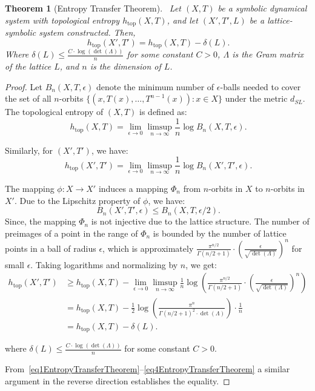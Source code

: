\documentclass[12pt,a4paper]{article}
\newtheorem{theorem}{Theorem}[section]
\begin{document}
\begin{theorem}[Entropy Transfer Theorem]~\label{EntropyTransferTheorem}
Let $(X, T)$ be a symbolic dynamical system with topological entropy $h_{\text{top}}(X, T)$, and let $(X', T', L)$ be a lattice-symbolic system constructed. Then,
\begin{equation}~\label{eq1EntropyTransferTheorem}
h_{\text{top}}(X', T') = h_{\text{top}}(X, T) - \delta(L).
\end{equation}
Where $\delta(L) \leq \frac{C \cdot \log(\det(\Lambda))}{n}$ for some constant $C > 0$, $\Lambda$ is the Gram matrix of the lattice $L$, and $n$ is the dimension of $L$.
\end{theorem}

\begin{proof}
Let $B_n(X, T, \epsilon)$ denote the minimum number of $\epsilon$-balls needed to cover the set of all $n$-orbits $\{(x, T(x), \ldots, T^{n-1}(x)) : x \in X\}$ under the metric $d_{SL}$. The topological entropy of $(X, T)$ is defined as:
\begin{equation}~\label{eq2EntropyTransferTheorem}
h_{\text{top}}(X, T) = \lim_{\epsilon \to 0} \limsup_{n \to \infty} \frac{1}{n} \log B_n(X, T, \epsilon).
\end{equation}

Similarly, for $(X', T')$, we have:
\begin{equation}~\label{eq3EntropyTransferTheorem}
h_{\text{top}}(X', T') = \lim_{\epsilon \to 0} \limsup_{n \to \infty} \frac{1}{n} \log B_n(X', T', \epsilon).
\end{equation}

The mapping $\phi: X \to X'$ induces a mapping $\Phi_n$ from $n$-orbits in $X$ to $n$-orbits in $X'$. Due to the Lipschitz property of $\phi$, we have:
\begin{equation}~\label{eq4EntropyTransferTheorem}
B_n(X', T', \epsilon) \leq B_n(X, T, \epsilon/2).
\end{equation}
\noindent
Since, the mapping $\Phi_n$ is not injective due to the lattice structure. The number of preimages of a point in the range of $\Phi_n$ is bounded by the number of lattice points in a ball of radius $\epsilon$, which is approximately $\frac{\pi^{n/2}}{\Gamma(n/2+1)} \cdot \left(\frac{\epsilon}{\sqrt{\det(\Lambda)}}\right)^n$ for small $\epsilon$. Taking logarithms and normalizing by $n$, we get:
\begin{align*}
h_{\text{top}}(X', T') &\geq h_{\text{top}}(X, T) - \lim_{\epsilon \to 0} \limsup_{n \to \infty} \frac{1}{n} \log\left(\frac{\pi^{n/2}}{\Gamma(n/2+1)} \cdot \left(\frac{\epsilon}{\sqrt{\det(\Lambda)}}\right)^n\right) \\
&= h_{\text{top}}(X, T) - \frac{1}{2} \log\left(\frac{\pi^{n}}{\Gamma(n/2+1)^2 \cdot \det(\Lambda)}\right) \cdot \frac{1}{n} \\
&= h_{\text{top}}(X, T) - \delta(L).
\end{align*}

where $\delta(L) \leq \frac{C \cdot \log(\det(\Lambda))}{n}$ for some constant $C > 0$.

From~\eqref{eq1EntropyTransferTheorem}--\eqref{eq4EntropyTransferTheorem} a similar argument in the reverse direction establishes the equality.
\end{proof}
\end{document}
